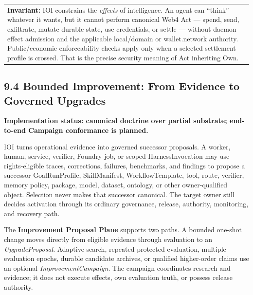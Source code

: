 \documentclass[
  11pt,
]{article}
\begin{document}
\begin{longtable}[]{@{}>{\raggedright\arraybackslash}p{\linewidth}@{}}
\toprule\noalign{}
 \\
\midrule\noalign{}
\endhead
\bottomrule\noalign{}
\endlastfoot
\textbf{Invariant:}\emph{\textbf{ }}IOI constrains the \emph{effects} of
intelligence. An agent can ``think'' whatever it wants, but it cannot
perform canonical Web4 Act --- spend, send, exfiltrate, mutate durable
state, use credentials, or settle --- without daemon effect admission and
the applicable local/domain or wallet.network authority. Public/economic
enforceability checks apply only when a selected settlement profile is
crossed. That is the precise security meaning of Act inheriting Own. \\
\end{longtable}

\hypertarget{proposal-mediated-improvement-upgrades-as-governed-transactions}{%
\subsection{9.4 Bounded Improvement: From Evidence to Governed
Upgrades}\label{proposal-mediated-improvement-upgrades-as-governed-transactions}}

\textbf{Implementation status: canonical doctrine over partial substrate;
end-to-end Campaign conformance is planned.}

IOI turns operational evidence into governed successor proposals. A worker,
human, service, verifier, Foundry job, or scoped HarnessInvocation may use
rights-eligible traces, corrections, failures, benchmarks, and findings to
propose a successor GoalRunProfile, SkillManifest, WorkflowTemplate, tool,
route, verifier, memory policy, package, model, dataset, ontology, or other
owner-qualified object. Selection never makes that successor canonical. The
target owner still decides activation through its ordinary governance,
release, authority, monitoring, and recovery path.

The \textbf{Improvement Proposal Plane} supports two paths. A bounded one-shot
change moves directly from eligible evidence through evaluation to an
\emph{UpgradeProposal}. Adaptive search, repeated protected evaluation,
multiple evaluation epochs, durable candidate archives, or qualified
higher-order claims use an optional \emph{ImprovementCampaign}. The campaign
coordinates research and evidence; it does not execute effects, own evaluation
truth, or possess release authority.
\end{document}
